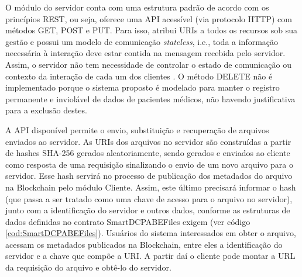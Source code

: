 \documentclass[a4paper,11pt]{article}
\begin{document}
O módulo do servidor conta com uma estrutura padrão de acordo com os princípios REST, ou seja, oferece uma API acessível (via protocolo HTTP) com métodos GET, POST e PUT. Para isso, atribui URIs a todos os recursos sob sua gestão e possui um modelo de comunicação \emph{stateless}, i.e., toda a informação necessária à interação deve estar contida na mensagem recebida pelo servidor. Assim, o servidor não tem necessidade de controlar o estado de comunicação ou contexto da interação de cada um dos clientes \cite{Mark2013}.
O método DELETE não é implementado porque o sistema proposto é modelado para manter o registro permanente e inviolável de dados de pacientes médicos, não havendo justificativa para a exclusão destes. %


A API disponível permite o envio, substituição e recuperação de arquivos enviados ao servidor.
As URIs dos arquivos no servidor são construídas a partir de hashes SHA-256 gerados aleatoriamente, sendo gerados e enviados ao cliente como resposta de uma requisição sinalizando o envio de um novo arquivo para o servidor.
Esse hash servirá no processo de publicação dos metadados do arquivo na Blockchain pelo módulo Cliente. Assim, este último precisará informar o hash (que passa a ser tratado como uma chave de acesso para o arquivo no servidor), junto com a identificação do servidor e outros dados, conforme as estruturas de dados definidas no contrato SmartDCPABEFiles exigem (ver código \ref{cod:SmartDCPABEFiles}).
Usuários do sistema interessados em obter o arquivo, acessam os metadados publicados na Blockchain, entre eles a identificação do servidor e a chave que compõe a URI.
A partir daí o cliente pode montar a URL da requisição do arquivo e obtê-lo do servidor.

\end{document}
